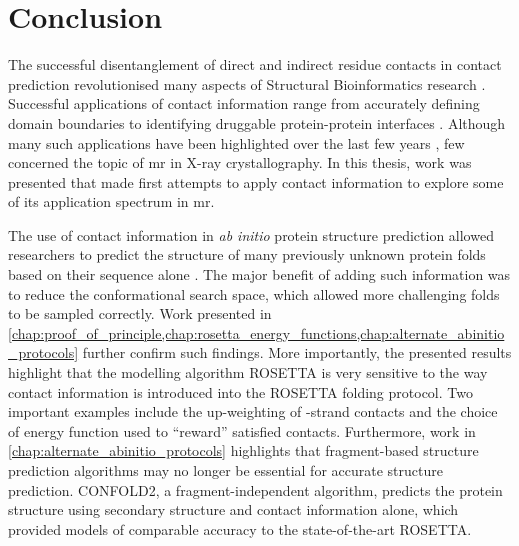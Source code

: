 \section{Conclusion}
The successful disentanglement of direct and indirect residue contacts in contact prediction revolutionised many aspects of Structural Bioinformatics research \cite{Simkovic2017-xs}. Successful applications of contact information range from accurately defining domain boundaries \cite{Sadowski2013-zu} to identifying druggable protein-protein interfaces \cite{Bai2016-sw}. Although many such applications have been highlighted over the last few years \cite{Simkovic2017-xs}, few concerned the topic of \gls{mr} in X-ray crystallography. In this thesis, work was presented that made first attempts to apply contact information to explore some of its application spectrum in \gls{mr}.

The use of contact information in \textit{ab initio} protein structure prediction allowed researchers to predict the structure of many previously unknown protein folds based on their sequence alone \cite[e.g.,][]{Marks2011-os,Michel2014-eg,Kosciolek2014-bt,Ovchinnikov2015-tn,Ovchinnikov2016-jj,Michel2017-xh,De_Oliveira2017-sg,Ovchinnikov2017-nd,Wang2017-rx}. The major benefit of adding such information was to reduce the conformational search space, which allowed more challenging folds to be sampled correctly. Work presented in \cref{chap:proof_of_principle,chap:rosetta_energy_functions,chap:alternate_abinitio_protocols} further confirm such findings. More importantly, the presented results highlight that the modelling algorithm ROSETTA is very sensitive to the way contact information is introduced into the ROSETTA folding protocol. Two important examples include the up-weighting of \textbeta-strand contacts and the choice of energy function used to ``reward'' satisfied contacts. Furthermore, work in \cref{chap:alternate_abinitio_protocols} highlights that fragment-based structure prediction algorithms may no longer be essential for accurate structure prediction. CONFOLD2, a fragment-independent algorithm, predicts the protein structure using secondary structure and contact information alone, which provided models of comparable accuracy to the state-of-the-art ROSETTA.

